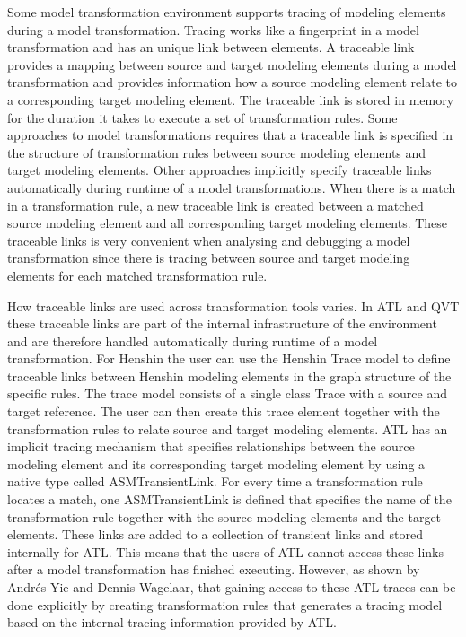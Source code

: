 Some model transformation environment supports tracing of modeling
elements during a model transformation. Tracing works like a fingerprint in a
model transformation and has an unique link between elements. A traceable link
provides a mapping between source and target modeling elements during a model
transformation and provides information how a source modeling element relate
to a corresponding target modeling element. The traceable link is stored in
memory for the duration it takes to execute a set of transformation rules. Some
approaches to model transformations requires that a traceable link is
specified in the structure of transformation rules between source modeling
elements and target modeling elements. Other approaches implicitly specify
traceable links automatically during runtime of a model transformations. When
there is a match in a transformation rule, a new traceable link is created
between a matched source modeling element and all corresponding target modeling
elements. These traceable links is very convenient when analysing and debugging
a model transformation since there is tracing between source and target
modeling elements for each matched transformation rule.

How traceable links are used across transformation tools varies. In ATL
and QVT these traceable links are part of the internal infrastructure of the
environment and are therefore handled automatically during runtime of a model
transformation. For Henshin the user can use the Henshin Trace model to define
traceable links between Henshin modeling elements in the graph structure of the
specific rules. The trace model consists of a single class Trace with a source
and target reference. The user can then create this trace element together with
the transformation rules to relate source and target modeling elements. ATL has
an implicit tracing mechanism that specifies relationships between the source
modeling element and its corresponding target modeling element by using a
native type called ASMTransientLink\cite{Wagelaar}. For every time a
transformation rule locates a match, one ASMTransientLink is defined that
specifies the name of the transformation rule together with the source modeling
elements and the target elements. These links are added to a collection of
transient links and stored internally for ATL. This means that the users of ATL
cannot access these links after a model transformation has finished executing.
However, as shown by Andr\'{e}s Yie and Dennis Wagelaar\cite{Wagelaar}, that
gaining access to these ATL traces can be done explicitly by creating
transformation rules that generates a tracing model based on the internal
tracing information provided by ATL.

